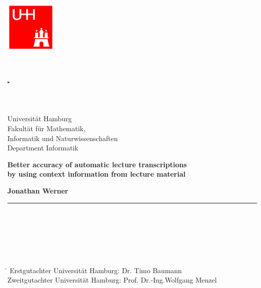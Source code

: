 \begin{titlepage}

  \setcounter{page}{-1}

		\begin{minipage}[b]{25mm}
			\includegraphics[width=25mm,clip]{images/logo_uhh}
		\end{minipage}
		\begin{minipage}[b]{2mm}
			\includegraphics[width=1mm,height=24mm]{images/greypixel}
		\end{minipage}
		\begin{minipage}[b]{12 cm}
			{\sffamily
				{\Large Universität Hamburg } \\
				Fakultät für Mathematik,\\
				Informatik und Naturwissenschaften \\
				Department Informatik \\
			}
		\end{minipage}

	\vfill

	\begin{center}
		\vspace{14mm}
		\noindent \textbf{\large
		  Better accuracy of automatic lecture transcriptions \\ by using context information from lecture material
		}
		\vspace{10mm}

	\end{center}

	\vfill

	\noindent \textbf{Jonathan Werner} \\
	\noindent \rule{\textwidth}{0.4mm}
	 \\
	 \\
	 \\
	 \\
	 \\
	\begin{tabbing}
	\hspace{20em} \=  \kill
	Erstgutachter Universität Hamburg: \> Dr. Timo Baumann \\
	Zweitgutachter Universität Hamburg: \> Prof. Dr.-Ing.Wolfgang Menzel \\


\end{tabbing}
\end{titlepage}
